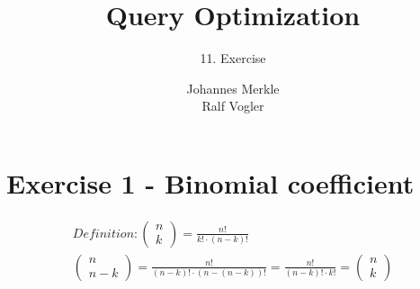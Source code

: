 \documentclass[11pt,a4paper]{scrartcl}
\begin{document}
\author{Johannes Merkle\\Ralf Vogler}
\title{Query Optimization}
\subtitle{11. Exercise}

\maketitle

\section*{Exercise 1 - Binomial coefficient}
\begin{align}
Definition: \begin{pmatrix} n \\ k \end{pmatrix} = \frac{n!}{k! \cdot (n-k)!}\\
\begin{pmatrix} n \\ n-k \end{pmatrix} = \frac{n!}{(n-k)! \cdot (n-(n-k))!} = \frac{n!}{(n-k)! \cdot k!} = \begin{pmatrix} n \\ k \end{pmatrix}
\end{align}
\end{document}
